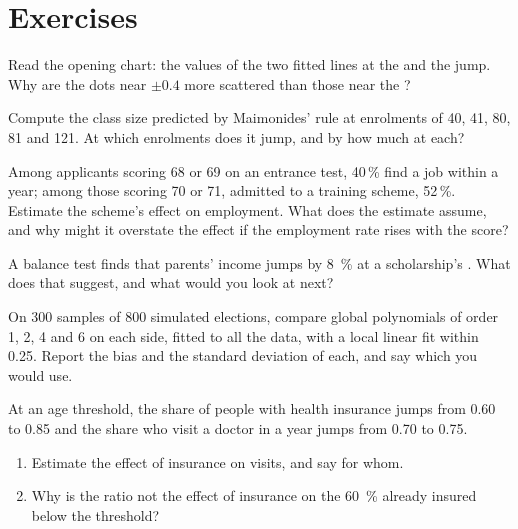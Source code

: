 \section{Exercises}\label{sec:b3:regression-discontinuity:exercises}

\begin{exercise}[$\star$]\label{exo:b3:regression-discontinuity:1}
Read the opening chart: the values of the two fitted lines at the  and
the jump. Why are the dots near $\pm 0.4$ more scattered than those near the
?
\end{exercise}

\begin{exercise}[$\star$]\label{exo:b3:regression-discontinuity:2}
Compute the class size predicted by Maimonides' rule at enrolments of 40, 41, 80,
81 and 121. At which enrolments does it jump, and by how much at each?
\end{exercise}

\begin{exercise}[$\star$]\label{exo:b3:regression-discontinuity:3}
Among applicants scoring 68 or 69 on an entrance test, 40\,\% find a job within a
year; among those scoring 70 or 71, admitted to a training scheme, 52\,\%.
Estimate the scheme's effect on employment. What does the estimate assume, and
why might it overstate the effect if the employment rate rises with the score?
\end{exercise}

\begin{exercise}[$\star$]\label{exo:b3:regression-discontinuity:4}
A balance test finds that parents' income jumps by 8~\% at a scholarship's
. What does that suggest, and what would you look at next?
\end{exercise}

\begin{exercise}[$\star\star$]\label{exo:b3:regression-discontinuity:5}
On 300 samples of 800 simulated elections, compare global polynomials of order
1, 2, 4 and 6 on each side, fitted to all the data, with a local linear fit
within 0.25. Report the bias and the standard deviation of each, and say which
you would use.
\end{exercise}

\begin{exercise}[$\star\star$]\label{exo:b3:regression-discontinuity:6}
At an age threshold, the share of people with health insurance jumps from 0.60
to 0.85 and the share who visit a doctor in a year jumps from 0.70 to 0.75.
\begin{enumerate}
\item Estimate the effect of insurance on visits, and say for whom.
\item Why is the ratio not the effect of insurance on the 60~\% already insured
below the threshold?
\end{enumerate}
\end{exercise}

